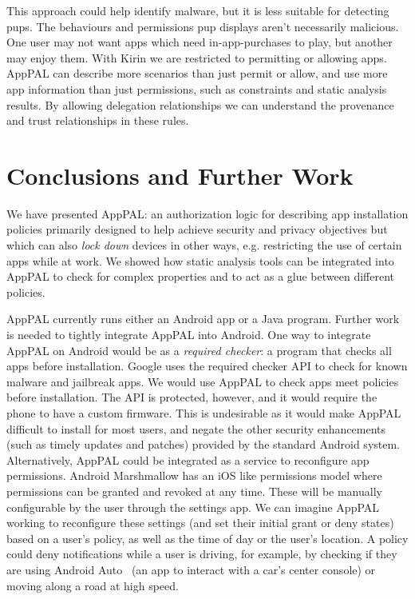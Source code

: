 \documentclass[]{llncs}
\begin{document}
This approach could help identify malware, but it is less suitable for detecting \acp{pup}.
The behaviours and permissions \ac{pup} displays aren't necessarily malicious.
One user may not want apps which need in-app-purchases to play, but another may enjoy them.
With Kirin we are restricted to permitting or allowing apps.
AppPAL can describe more scenarios than just permit or allow, and use more app information than just permissions, such as constraints and static analysis results.
By allowing delegation relationships we can understand the provenance and trust relationships in these rules.

\section{Conclusions and Further Work}

We have presented AppPAL: an authorization logic for describing app installation policies primarily designed to help achieve security and privacy objectives but which can also \emph{lock down} devices in other ways, e.g. restricting the use of certain apps while at work.
We showed how static analysis tools can be integrated into AppPAL to check for complex properties and to act as a glue between different policies.

AppPAL currently runs either an Android app or a Java program.
Further work is needed to tightly integrate AppPAL into Android.
One way to integrate AppPAL on Android would be as a \emph{required checker}: a program that checks all apps before installation.
Google uses the required checker API to check for known malware and jailbreak apps.
We would use AppPAL to check apps meet policies before installation.
The API is protected, however, and it would require the phone to have a custom firmware.
This is undesirable as it would make AppPAL difficult to install for most users, and negate the other security enhancements (such as timely updates and patches) provided by the standard Android system.
Alternatively, AppPAL could be integrated as a service to reconfigure app permissions.
Android Marshmallow has an iOS like permissions model where permissions can be granted and revoked at any time.
These will be manually configurable by the user through the settings app.
We can imagine AppPAL working to reconfigure these settings (and set their initial grant or deny states) based on a user's policy, as well as the time of day or the user's location.
A policy could deny notifications while a user is driving, for example, by checking if they are using Android Auto~\cite{AndroidAuto:uw} (an app to interact with a car's center console) or moving along a road at high speed.
\end{document}
